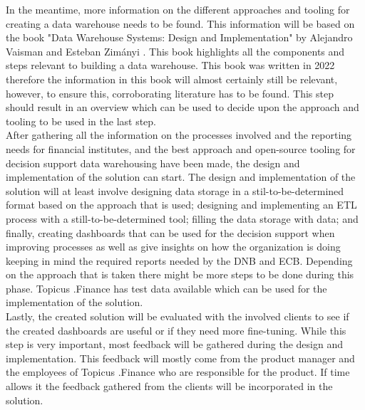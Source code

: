 \documentclass[11pt]{article}
\begin{document}
In the meantime, more information on the different approaches and tooling for creating a data warehouse needs to be found. This information will be based on the book "Data Warehouse Systems: Design and Implementation" by Alejandro Vaisman and Esteban Zimányi \cite{vaisman2014data}. This book highlights all the components and steps relevant to building a data warehouse. This book was written in 2022 therefore the information in this book will almost certainly still be relevant, however, to ensure this, corroborating literature has to be found. This step should result in an overview which can be used to decide upon the approach and tooling to be used in the last step.\\

After gathering all the information on the processes involved and the reporting needs for financial institutes, and the best approach and open-source tooling for decision support data warehousing have been made, the design and implementation of the solution can start. The design and implementation of the solution will at least involve designing data storage in a stil-to-be-determined format based on the approach that is used; designing and implementing an ETL process with a still-to-be-determined tool; filling the data storage with data; and finally, creating dashboards that can be used for the decision support when improving processes as well as give insights on how the organization is doing keeping in mind the required reports needed by the DNB and ECB. Depending on the approach that is taken there might be more steps to be done during this phase. Topicus .Finance has test data available which can be used for the implementation of the solution. \\

Lastly, the created solution will be evaluated with the involved clients to see if the created dashboards are useful or if they need more fine-tuning. While this step is very important, most feedback will be gathered during the design and implementation. This feedback will mostly come from the product manager and the employees of Topicus .Finance who are responsible for the product. If time allows it the feedback gathered from the clients will be incorporated in the solution.
\end{document}
